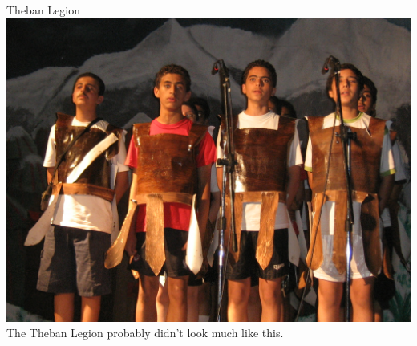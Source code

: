 \begin{frame}{Theban Legion}
    \centering
    \includegraphics[height=0.8\textheight]{img/theban-4.jpg} \\
    The Theban Legion probably didn't look much like this. \\
\end{frame}

